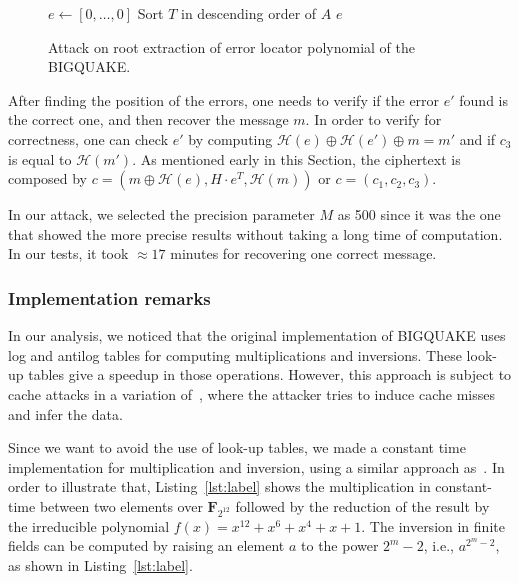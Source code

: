 \begin{figure}
\centering
\begin{algorithm}[H]
 $e \gets [0,\ldots,0]$\;
Sort $T$ in descending order of $A$\;
\Return $e$\;
 \caption{Attack on root extraction of error locator polynomial of the BIGQUAKE.}
  \label{alg:attack:1}
\end{algorithm}
\end{figure}

After finding the position of the errors, one needs to verify if the error $e'$ found is the correct one, and then recover the message $m$. In order to verify for correctness, one can check $e'$ by computing $\mathcal{H}(e) \oplus \mathcal{H}(e') \oplus m = m'$ and if $c_3$ is equal to $\mathcal{H}(m')$. As mentioned early in this Section, the ciphertext is composed by $c = (m\oplus\mathcal{H}(e), H\cdot e^T, \mathcal{H}(m))$ or $c = (c_1, c_2, c_3)$.

In our attack, we selected the precision parameter $M$ as 500 since it was the one that showed the more precise results without taking a long time of computation.  In our tests, it took $\approx17$ minutes for recovering one correct message.

\subsubsection{Implementation remarks}
In our analysis, we noticed that the original implementation of BIGQUAKE uses log and antilog tables for computing multiplications and inversions. These look-up tables give a speedup in those operations. However, this approach is subject to cache attacks in a variation of~\cite{bruinderink2016flush}, where the attacker tries to induce cache misses and infer the data.

Since we want to avoid the use of look-up tables, we made a constant time implementation for multiplication and inversion, using a similar approach as~\cite{chou2017mcbits}. In order to illustrate that, Listing~\ref{lst:label} shows the multiplication in constant-time between two elements over $\mathbf{F}_{2^{12}}$ followed by the reduction of the result by the irreducible polynomial $f(x) = x^{12} + x^6 +x^4 +x + 1$. The inversion in finite fields can be computed by raising an element $a$ to the power $2^{m}-2$, i.e., $a^{2^{m}-2}$, as shown in Listing~\ref{lst:label}.